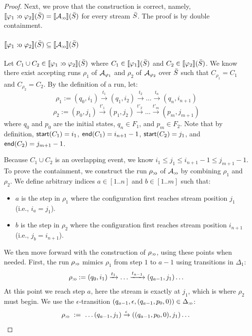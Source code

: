 \begin{proof}
Next, we prove that the construction is correct, namely, $\sem{\varphi_1 \overlap \varphi_2}(\Stream) = \sem{\cAoverlap}(\Stream)$ for every stream $\bar{S}$. The proof is by double containment. 

\paragraph{$\sem{\varphi_1 \overlap \varphi_2}(\Stream) \subseteq \sem{\cAoverlap}(\Stream)$}
Let $C_1 \cup C_2 \in \sem{\varphi_1 \overlap \varphi_2}(\Stream)$ where $C_1 \in \sem{\varphi_1}(\Stream)$ and $C_2 \in \sem{\varphi_2}(\Stream)$. We know there exist accepting runs $\rho_1$ of $\mathcal{A}_{\varphi_1}$ and $\rho_2$ of $\mathcal{A}_{\varphi_2}$ over $\bar{S}$ such that $C_{\rho_1} = C_1$ and $C_{\rho_2} = C_2$.
By the definition of a run, let:
\[ \rho_1 := (q_0, i_1) \xrightarrow{t_1} (q_1, i_2) \xrightarrow{t_2} \dots \xrightarrow{t_n} (q_{n}, i_{n+1}) \]
\[ \rho_2 := (p_0, j_1) \xrightarrow{t'_1} (p_1, j_2) \xrightarrow{t'_2} \dots \xrightarrow{t'_m} (p_{m}, j_{m+1}) \]
where $q_0$ and $p_0$ are the initial states, $q_{n} \in F_1$, and $p_{m} \in F_2$. Note that by definition, $\mathsf{start}(C_1) = i_1$, $\mathsf{end}(C_1) = i_{n+1} - 1$, $\mathsf{start}(C_2) = j_1$, and $\mathsf{end}(C_2) = j_{m+1} - 1$.

Because $C_1 \cup C_2$ is an overlapping event, we know $i_1 \leq j_1 \leq i_{n+1} - 1 \leq j_{m+1} - 1$.
To prove the containment, we construct the run $\rho_{\text{:o}}$ of $\mathcal{A}_{\text{:o}}$ by combining $\rho_1$ and $\rho_2$. We define arbitrary indices $a \in [1..n]$ and $b \in [1..m]$ such that:
\begin{itemize}
	\item $a$ is the step in $\rho_1$ where the configuration first reaches stream position $j_1$ (i.e., $i_a = j_1$).
	\item $b$ is the step in $\rho_2$ where the configuration first reaches stream position $i_{n+1}$ (i.e., $j_b = i_{n+1}$).
\end{itemize}
We then move forward with the construction of $\rho_{\text{:o}}$, using these points when needed.
First, the run $\rho_{\text{:o}}$ mimics $\rho_1$ from step $1$ to $a-1$ using transitions in $\Delta_1$:
\[ 
\rho_{\text{:o}} := (q_0, i_1) \xrightarrow{t_1} \dots \xrightarrow{t_{a-1}} (q_{a-1}, j_1)  \ldots 
\]
At this point we reach step $a$, here the stream is exactly at $j_1$, which is where $\rho_2$ must begin. We use the $\epsilon$-transition $(q_{a-1}, \epsilon, (q_{a-1}, p_0, 0)) \in \Delta_{\text{:o}}$:
\[ \rho_{\text{:o}} \ := \ \dots (q_{a-1}, j_1) \xrightarrow{\epsilon} ((q_{a-1}, p_0, 0), j_1) \dots \]


\end{proof}
